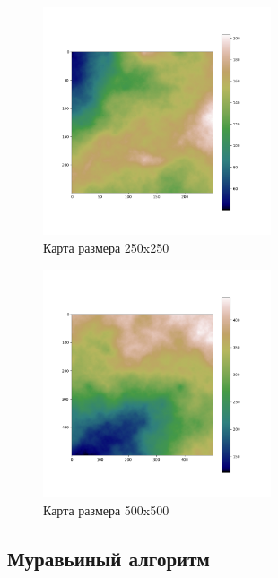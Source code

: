 \documentclass{article}
\numberwithin{equation}{section}
\begin{document}
			\begin{figure}[H]
				\centering
				\vspace{-0.5cm}
				\includegraphics[width=0.6\textwidth]{data/maps_example/250x250.png}
				\vspace{-0.5cm}
				\caption{Карта размера 250x250}\label{fig:map1}
			\end{figure}

			\begin{figure}[H]
				\centering
				\vspace{-0.5cm}
				\includegraphics[width=0.6\textwidth]{data/maps_example/500x500.png}
				\vspace{-0.5cm}
				\caption{Карта размера 500x500}\label{fig:map2}
			\end{figure}

		\subsection{Муравьиный алгоритм}
\end{document}
